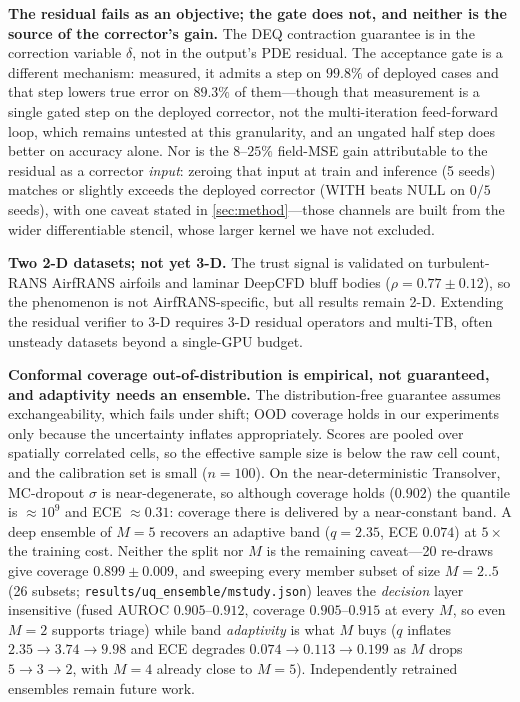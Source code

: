 \item \textbf{The residual fails as an objective; the gate does not, and neither is the
source of the corrector's gain.} The DEQ contraction guarantee is in the correction
variable $\delta$, not in the output's PDE residual. The acceptance gate is a different
mechanism: measured, it admits a step on $99.8\%$ of deployed cases and that step lowers
true error on $89.3\%$ of them---though that measurement is a single gated step on the
deployed corrector, not the multi-iteration feed-forward loop, which remains untested at
this granularity, and an ungated half step does better on accuracy alone. Nor is the
$8$--$25\%$ field-MSE gain attributable to the residual as a corrector \emph{input}:
zeroing that input at train and inference (5 seeds) matches or slightly exceeds the
deployed corrector (WITH beats NULL on $0/5$ seeds), with one caveat stated in
\autoref{sec:method}---those channels are built from the wider differentiable stencil,
whose larger kernel we have not excluded.

\item \textbf{Two 2-D datasets; not yet 3-D.} The trust signal is validated on
turbulent-RANS AirfRANS airfoils and laminar DeepCFD bluff bodies ($\rho=0.77{\pm}0.12$),
so the phenomenon is not AirfRANS-specific, but all results remain 2-D. Extending the
residual verifier to 3-D \citep{ahmedml2024,elrefaie2024drivaernet} requires 3-D residual
operators and multi-TB, often unsteady datasets beyond a single-GPU budget.

\item \textbf{Conformal coverage out-of-distribution is empirical, not guaranteed, and
adaptivity needs an ensemble.} The distribution-free guarantee assumes exchangeability,
which fails under shift; OOD coverage holds in our experiments only because the uncertainty
inflates appropriately. Scores are pooled over spatially correlated cells, so the effective
sample size is below the raw cell count, and the calibration set is small ($n=100$). On the
near-deterministic Transolver, MC-dropout $\sigma$ is near-degenerate, so although coverage
holds ($0.902$) the quantile is $\approx 10^9$ and ECE $\approx 0.31$: coverage there is
delivered by a near-constant band. A deep ensemble of $M{=}5$ recovers an adaptive band
($q=2.35$, ECE $0.074$) at $5\times$ the training cost. Neither the split nor $M$ is the
remaining caveat---20 re-draws give coverage $0.899{\pm}0.009$, and sweeping every member
subset of size $M=2..5$ (26 subsets; \texttt{results/uq\_ensemble/mstudy.json}) leaves the
\emph{decision} layer insensitive (fused AUROC $0.905$--$0.912$, coverage $0.905$--$0.915$
at every $M$, so even $M{=}2$ supports triage) while band \emph{adaptivity} is what $M$
buys ($q$ inflates $2.35 \rightarrow 3.74 \rightarrow 9.98$ and ECE degrades $0.074
\rightarrow 0.113 \rightarrow 0.199$ as $M$ drops $5 \rightarrow 3 \rightarrow 2$, with
$M{=}4$ already close to $M{=}5$). Independently retrained ensembles remain future work.

